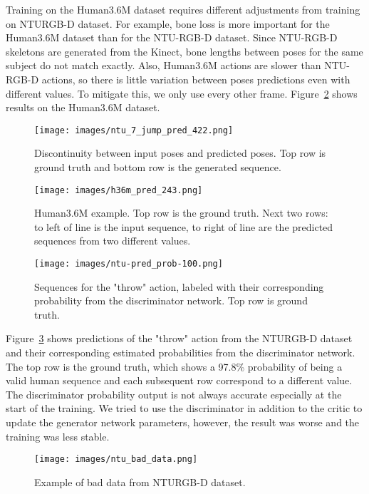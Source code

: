 \documentclass[10pt,twocolumn,letterpaper]{article}
\begin{document}
Training on the Human3.6M dataset requires different adjustments from training on NTURGB-D dataset. For example, bone loss is more important for the Human3.6M dataset than for the NTU-RGB-D dataset. Since NTU-RGB-D skeletons are generated from the Kinect, bone lengths between poses for the same subject do not match exactly. Also, Human3.6M actions are slower than NTU-RGB-D actions, so there is little variation between poses predictions even with different  values. To mitigate this, we only use every other frame. Figure~\ref{figure:human36m} shows results on the Human3.6M dataset.

\begin{figure}[ht]
\centering
\texttt{[image: images/ntu\_7\_jump\_pred\_422.png]}
\caption{Discontinuity between input poses and predicted poses. Top row is ground truth and bottom row is the generated sequence.}
\label{figure:jumpiness}
\end{figure}

\begin{figure}[H]
\centering
\texttt{[image: images/h36m\_pred\_243.png]}
\caption{Human3.6M example. Top row is the ground truth. Next two rows: to left of line is the input sequence, to right of line are the predicted sequences from two different  values.}
\label{figure:human36m}
\end{figure}

\begin{figure}[H]
\centering
\texttt{[image: images/ntu-pred\_prob-100.png]}
\caption{Sequences for the "throw" action, labeled with their corresponding probability from the discriminator network. Top row is ground truth.}
\label{figure:probability}
\end{figure}

Figure~\ref{figure:probability} shows predictions of the "throw" action from the NTURGB-D dataset and their corresponding estimated probabilities from the discriminator network. The top row is the ground truth, which shows a 97.8\% probability of being a valid human sequence and each subsequent row correspond to a different  value. The discriminator probability output is not always accurate especially at the start of the training. We tried to use the discriminator in addition to the critic to update the generator network parameters, however, the result was worse and the training was less stable.

\begin{figure}[H]
\centering
\texttt{[image: images/ntu\_bad\_data.png]}
\caption{Example of bad data from NTURGB-D dataset.}
\label{figure:ntu-bad-data}
\end{figure}
\end{document}
